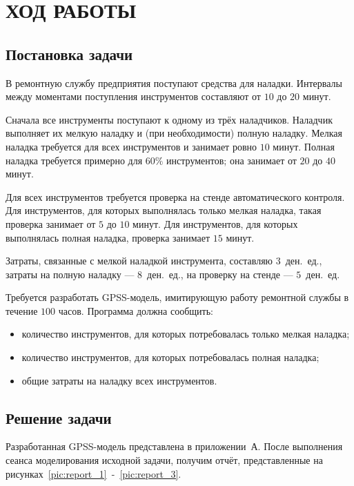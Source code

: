 \section{ХОД РАБОТЫ}

\subsection{Постановка задачи}

В ремонтную службу предприятия поступают средства для наладки. Интервалы между
моментами поступления инструментов составляют от $10$ до $20$ минут.

Сначала все инструменты поступают к одному из трёх наладчиков. Наладчик выполняет
их мелкую наладку и (при необходимости) полную наладку. Мелкая наладка
требуется для всех инструментов и занимает ровно $10$ минут. Полная наладка
требуется примерно для $60\%$ инструментов; она занимает от $20$ до $40$ минут.

Для всех инструментов требуется проверка на стенде автоматического контроля.
Для инструментов, для которых выполнялась только мелкая наладка, такая проверка
занимает от $5$ до $10$ минут. Для инструментов, для которых выполнялась
полная наладка, проверка занимает $15$ минут.

Затраты, связанные с мелкой наладкой инструмента, составляю $3$~ден.~ед., затраты
на полную наладку --- $8$~ден.~ед., на проверку на стенде --- $5$~ден.~ед.

Требуется разработать GPSS-модель, имитирующую работу ремонтной службы в течение
$100$ часов. Программа должна сообщить:

\begin{itemize}
  \item количество инструментов, для которых потребовалась только мелкая наладка;
  \item количество инструментов, для которых потребовалась полная наладка;
  \item общие затраты на наладку всех инструментов.
\end{itemize}

\subsection{Решение задачи}

Разработанная GPSS-модель представлена в приложении~А. После выполнения сеанса
моделирования исходной задачи, получим отчёт, представленные на
рисунках~\ref{pic:report_1}~-~\ref{pic:report_3}.

